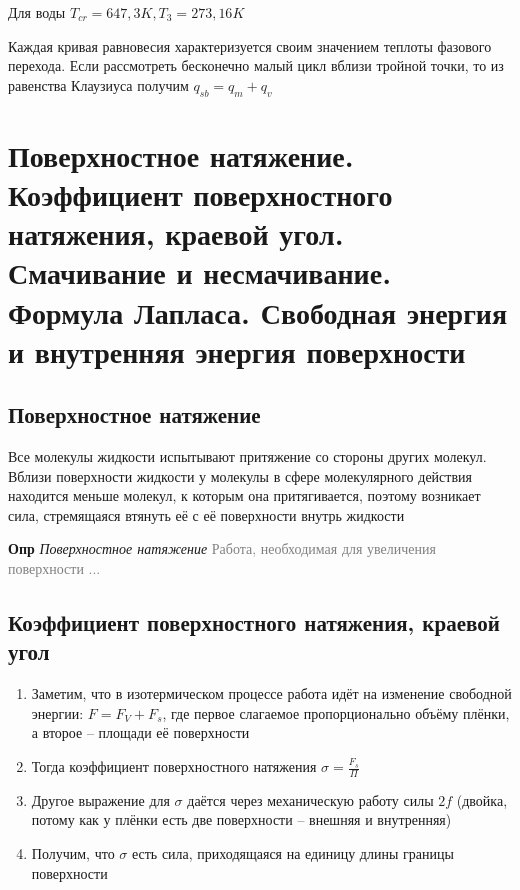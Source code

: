 \documentclass[a4paper, 14pt]{article}
\begin{document}
    Для воды $T_{cr} = 647,3 K, T_3 = 273,16 K$

    Каждая кривая равновесия характеризуется своим значением теплоты фазового перехода.
    Если рассмотреть бесконечно малый цикл вблизи тройной точки, то из равенства Клаузиуса получим $q_{sb} = q_m + q_{v}$

    \section{Поверхностное натяжение.
    Коэффициент поверхностного натяжения, краевой угол.
    Смачивание и несмачивание.
    Формула Лапласа.
    Свободная энергия и внутренняя энергия поверхности}

    \subsection{Поверхностное натяжение}

    Все молекулы жидкости испытывают притяжение со стороны других молекул.
    Вблизи поверхности жидкости у молекулы в сфере молекулярного действия находится меньше молекул, к которым она
    притягивается, поэтому возникает сила, стремящаяся втянуть её с её поверхности внутрь жидкости

    \textbf{Опр} \textit{Поверхностное натяжение} \textcolor{gray}{Работа, необходимая для увеличения поверхности ...}

    \subsection{Коэффициент поверхностного натяжения, краевой угол}

    \begin{enumerate}
        \item Заметим, что в изотермическом процессе работа идёт на изменение свободной энергии: $F = F_V + F_s$, где
        первое слагаемое пропорционально объёму плёнки, а второе -- площади её поверхности
        \item Тогда коэффициент поверхностного натяжения $\sigma = \frac{F_s}{\Pi}$
        \item Другое выражение для $\sigma$ даётся через механическую работу силы $2f$ (двойка, потому как у плёнки
        есть две поверхности -- внешняя и внутренняя)
        \item Получим, что $\sigma$ есть сила, приходящаяся на единицу длины границы поверхности
    \end{enumerate}
\end{document}
